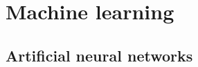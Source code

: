 \documentclass[12pt]{iopart}
\begin{document}
\section{Machine learning} \label{ML overview}

%
\subsection{Artificial neural networks}

%
\end{document}
